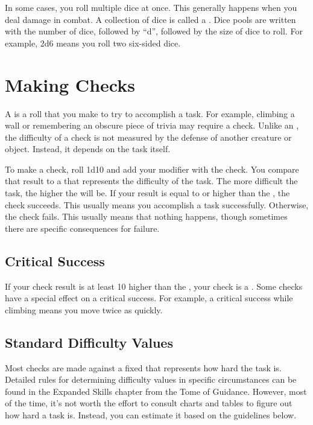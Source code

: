   In some cases, you roll multiple dice at once.
  This generally happens when you deal damage in combat.
  A collection of dice is called a .
  Dice pools are written with the number of dice, followed by ``d'', followed by the size of dice to roll.
  For example, 2d6 means you roll two six-sided dice.

\section{Making Checks}\label{Checks}\label{Making Checks}
  A  is a roll that you make to try to accomplish a task.
  For example, climbing a wall or remembering an obscure piece of trivia may require a check.
  Unlike an , the difficulty of a check is not measured by the defense of another creature or object.
  Instead, it depends on the task itself.

  To make a check, roll 1d10 and add your modifier with the check.
  You compare that result to a  that represents the difficulty of the task.
  The more difficult the task, the higher the  will be.
  If your result is equal to or higher than the , the check succeeds.
  This usually means you accomplish a task successfully.
  Otherwise, the check fails.
  This usually means that nothing happens, though sometimes there are specific consequences for failure.

  \subsection{Critical Success}
    If your check result is at least 10 higher than the , your check is a .
    Some checks have a special effect on a critical success.
    For example, a critical success while climbing means you move twice as quickly.

  \subsection{Standard Difficulty Values}\label{Standard Difficulty Values}
    Most checks are made against a fixed  that represents how hard the task is.
    Detailed rules for determining difficulty values in specific circumstances can be found in the Expanded Skills chapter from the Tome of Guidance.
    However, most of the time, it's not worth the effort to consult charts and tables to figure out how hard a task is.
    Instead, you can estimate it based on the guidelines below.

